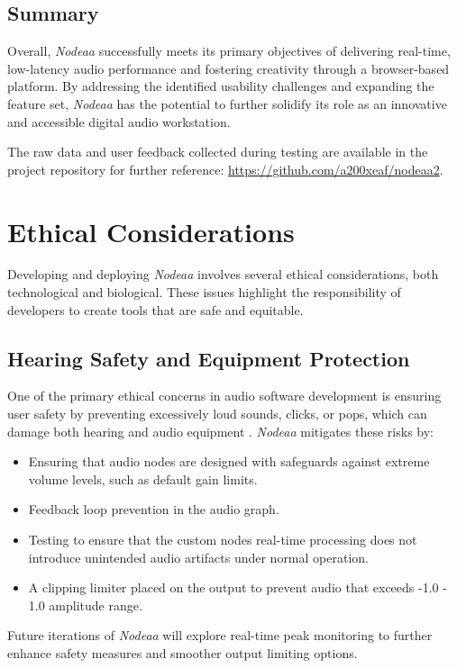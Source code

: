 \documentclass[10pt,twocolumn]{article}
\begin{document}
\subsection{Summary}
Overall, \textit{Nodeaa} successfully meets its primary objectives of delivering real-time, low-latency audio performance and fostering creativity through a browser-based platform. By addressing the identified usability challenges and expanding the feature set, \textit{Nodeaa} has the potential to further solidify its role as an innovative and accessible digital audio workstation.

The raw data and user feedback collected during testing are available in the project repository for further reference: \url{https://github.com/a200xeaf/nodeaa2}.

\section{Ethical Considerations}

Developing and deploying \textit{Nodeaa} involves several ethical considerations, both technological and biological. These issues highlight the responsibility of developers to create tools that are safe and equitable.

\subsection{Hearing Safety and Equipment Protection}
One of the primary ethical concerns in audio software development is ensuring user safety by preventing excessively loud sounds, clicks, or pops, which can damage both hearing and audio equipment \cite{zhao2010music} \cite{pienkowski2021loud}. \textit{Nodeaa} mitigates these risks by:
\begin{itemize}
    \item Ensuring that audio nodes are designed with safeguards against extreme volume levels, such as default gain limits.
    \item Feedback loop prevention in the audio graph.
    \item Testing to ensure that the custom nodes real-time processing does not introduce unintended audio artifacts under normal operation.
    \item A clipping limiter placed on the output to prevent audio that exceeds -1.0 - 1.0 amplitude range.
\end{itemize}
Future iterations of \textit{Nodeaa} will explore real-time peak monitoring to further enhance safety measures and smoother output limiting options.
\end{document}
